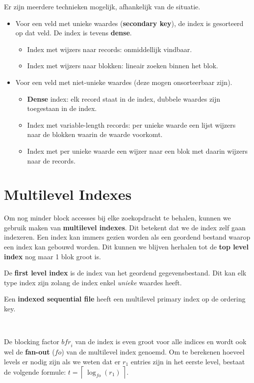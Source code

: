 Er zijn meerdere technieken mogelijk, afhankelijk van de situatie.
\begin{itemize}
	\item Voor een veld met unieke waardes (\textbf{secondary key}), de index is gesorteerd op dat veld. De index is tevens \textbf{dense}.
	\vspace{-2mm}
	\begin{itemize}
		\item Index met wijzers naar records: onmiddellijk vindbaar.
		\item Index met wijzers naar blokken: lineair zoeken binnen het blok.
	\end{itemize}
	
	\item Voor een veld met niet-unieke waardes (deze mogen onsorteerbaar zijn).
	\vspace{-2mm}
	\begin{itemize}
		\item \textbf{Dense} index: elk record staat in de index, dubbele waardes zijn toegestaan in de index.
		\item Index met variable-length records: per unieke waarde een lijst wijzers naar de blokken waarin de waarde voorkomt.
		\item Index met per unieke waarde een wijzer naar een blok met daarin wijzers naar de records.
	\end{itemize}
\end{itemize}



\section{Multilevel Indexes}
Om nog minder block accesses bij elke zoekopdracht te behalen, kunnen we gebruik maken van \textbf{multilevel indexes}. Dit betekent dat we de index zelf gaan indexeren. Een index kan immers gezien worden als een geordend bestand waarop een index kan gebouwd worden. Dit kunnen we blijven herhalen tot de \textbf{top level index} nog maar 1 blok groot is.

De \textbf{first level index} is de index van het geordend gegevensbestand. Dit kan elk type index zijn zolang de index enkel \textit{unieke} waardes heeft.

Een \textbf{indexed sequential file} heeft een multilevel primary index op de ordering key.

~

\noindent De blocking factor $\textit{bfr}_i$ van de index is even groot voor alle indices en wordt ook wel de \textbf{fan-out} ($\textit{fo}$) van de multilevel index genoemd. Om te berekenen hoeveel levels er nodig zijn als we weten dat er $r_1$ entries zijn in het eerste level, bestaat de volgende formule: $t = \left\lceil \, \log_\textit{fo} (r_1) \, \right\rceil$.

